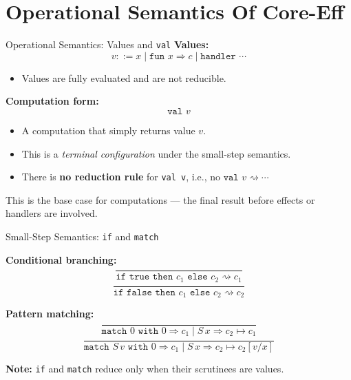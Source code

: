 \section{Operational Semantics Of Core-Eff}

\begin{frame}{Operational Semantics: Values and \texttt{val}}
\textbf{Values:}
\[
v ::= x \mid \texttt{fun } x \Rightarrow c \mid \texttt{handler } \cdots
\]
\begin{itemize}
  \item Values are fully evaluated and are not reducible.
\end{itemize}

\vspace{1em}
\textbf{Computation form:}
\[
\texttt{val } v
\]
\begin{itemize}
  \item A computation that simply returns value \( v \).
  \item This is a \emph{terminal configuration} under the small-step semantics.
  \item There is \textbf{no reduction rule} for \texttt{val v}, i.e., no \( \texttt{val } v \rightsquigarrow \cdots \)
\end{itemize}

\vspace{1em}
This is the base case for computations — the final result before effects or handlers are involved.
\end{frame}

\begin{frame}{Small-Step Semantics: \texttt{if} and \texttt{match}}

\textbf{Conditional branching:}
\[
\frac{}{\texttt{if true then } c_1 \texttt{ else } c_2 \rightsquigarrow c_1}
\]
\[
\frac{}{\texttt{if false then } c_1 \texttt{ else } c_2 \rightsquigarrow c_2}
\]

\vspace{1em}
\textbf{Pattern matching:}
\[
\frac{}{\texttt{match } 0 \texttt{ with } 0 \Rightarrow c_1 \mid S\,x \Rightarrow c_2 \mapsto c_1}
\]
\[
\frac{}{\texttt{match } S\,v \texttt{ with } 0 \Rightarrow c_1 \mid S\,x \Rightarrow c_2 \mapsto c_2[v/x]}
\]

\vspace{1em}
\textbf{Note:} \texttt{if} and \texttt{match} reduce only when their scrutinees are values.
\end{frame}

